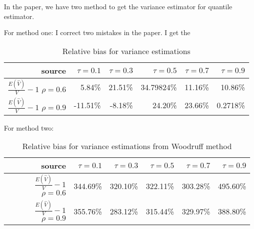 \documentclass[]{article}
\begin{document}
In the paper, we have two method to get the variance estimator for quantile estimator.

For method one: I correct two mistakes in the paper. I get the 
\begin{table}[H]
	\begin{tabular}{rrrrrr}
		\hline
		source & $\tau=0.1$ & $\tau=0.3$ & $\tau=0.5$ & $\tau=0.7$ & $\tau=0.9$\\
		\hline
		$\frac{E(\hat V)}{V}-1$ $\rho=0.6$ & 5.84\% & 21.51\% & 34.79824\% & 11.16\% &  10.86\%\\
		$\frac{E(\hat V)}{V}-1$ $\rho=0.9$ & -11.51\% & -8.18\% & 24.20\% & 23.66\% & 0.2718\%\\
		\hline
	\end{tabular}
	\caption{Relative bias for variance estimations}
\end{table}
 
For method two:
 \begin{table}[H]
 	\begin{tabular}{rrrrrr}
 		\hline
 		source & $\tau=0.1$ & $\tau=0.3$ & $\tau=0.5$ & $\tau=0.7$ & $\tau=0.9$\\
 		\hline
 		$\frac{E(\hat V)}{V}-1$ $\rho=0.6$ &344.69\% & 320.10\% & 322.11\% & 303.28\% &  495.60\%\\
 		$\frac{E(\hat V)}{V}-1$ $\rho=0.9$ & 355.76\% & 283.12\% & 315.44\% & 329.97\% & 388.80\%\\
 		\hline
 	\end{tabular}
 	\caption{Relative bias for variance estimations from Woodruff method}
 \end{table}
 
\end{document}
